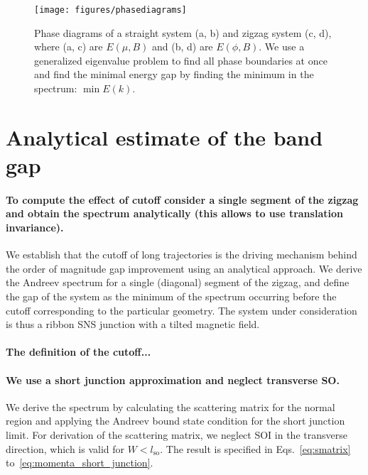 \documentclass[english, twocolumn, 10pt, aps, superscriptaddress, floatfix, prb, citeautoscript]{revtex4-1}
\renewcommand{\comment}[2]{#2}
\renewcommand{\comment}{\paragraph}
\begin{document}
\begin{figure}[!htb]
\texttt{[image: figures/phasediagrams]}
\caption{Phase diagrams of a straight system (a, b) and zigzag system (c, d), where (a, c) are $E(\mu, B)$ and (b, d) are $E(\phi, B)$.
We use a generalized eigenvalue problem to find all phase boundaries at once and find the minimal energy gap by finding the minimum in the spectrum: $\min{E(k)}$.
\label{fig:phasediagrams}}
\end{figure}

\section{Analytical estimate of the band gap}

\comment{To compute the effect of cutoff consider a single segment of the zigzag and obtain the spectrum analytically (this allows to use translation invariance).}
We establish that the cutoff of long trajectories is the driving mechanism behind the order of magnitude gap improvement using an analytical approach.
We derive the Andreev spectrum for a single (diagonal) segment of the zigzag, and define the gap of the system as the minimum of the spectrum occurring before the cutoff corresponding to the particular geometry.
The system under consideration is thus a ribbon SNS junction with a tilted magnetic field.

\comment{The definition of the cutoff... }

\comment{We use a short junction approximation and neglect transverse SO.}
We derive the spectrum by calculating the scattering matrix for the normal region and applying the Andreev bound state condition for the short junction limit\cite{beenakker1991universal, sticlet_robustness_2017}. 
For derivation of the scattering matrix, we neglect SOI in the transverse direction, which is valid for $W<l_\text{so}$.
The result is specified in Eqs.~\eqref{eq:smatrix} to~\eqref{eq:momenta_short_junction}.
\end{document}
